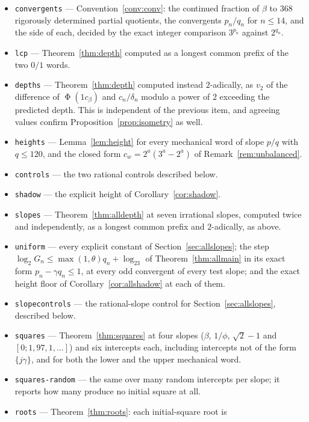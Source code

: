 \documentclass[11pt,reqno]{amsart}
\theoremstyle{plain}
\theoremstyle{definition}
\newcommand{\vt}{v_2}
\DeclareMathOperator{\Ph}{\Phi}
\begin{document}
\begin{itemize}
\item \texttt{convergents} --- Convention~\ref{conv:conv}: the continued fraction
of $\beta$ to $368$ rigorously determined partial quotients, the convergents
$p_n/q_n$ for $n\le14$, and the side of each, decided by the exact integer
comparison $3^{p_n}$ against $2^{q_n}$.
\item \texttt{lcp} --- Theorem~\ref{thm:depth} computed as a longest common
prefix of the two $0/1$ words.
\item \texttt{depths} --- Theorem~\ref{thm:depth} computed instead $2$-adically,
as $\vt$ of the difference of $\Ph(1c_\beta)$ and $c_n/\delta_n$ modulo a power
of $2$ exceeding the predicted depth. This is independent of the previous item,
and agreeing values confirm Proposition~\ref{prop:isometry} as well.
\item \texttt{heights} --- Lemma~\ref{lem:height} for every mechanical word of
slope $p/q$ with $q\le120$, and the closed form
$c_w=2^{a}(3^{a}-2^{a})$ of Remark~\ref{rem:unbalanced}.
\item \texttt{controls} --- the two rational controls described below.
\item \texttt{shadow} --- the explicit height of Corollary~\ref{cor:shadow}.
\item \texttt{slopes} --- Theorem~\ref{thm:alldepth} at seven irrational
slopes, computed twice and independently, as a longest common prefix and
$2$-adically, as above.
\item \texttt{uniform} --- every explicit constant of
Section~\ref{sec:allslopes}; the step $\log_2G_n\le\max(1,\theta)q_n+\log_23$ of
Theorem~\ref{thm:allmain} in its exact form $p_n-\gamma q_n\le1$, at every odd
convergent of every test slope; and the exact height floor of
Corollary~\ref{cor:allshadow} at each of them.
\item \texttt{slopecontrols} --- the rational-slope control for
Section~\ref{sec:allslopes}, described below.
\item \texttt{squares} --- Theorem~\ref{thm:squares} at four slopes
($\beta$, $1/\phi$, $\sqrt2-1$ and $[0;1,97,1,\dots]$) and six intercepts each,
including intercepts not of the form $\{j\gamma\}$, and for both the lower and
the upper mechanical word.
\item \texttt{squares-random} --- the same over many random intercepts per
slope; it reports how many produce no initial square at all.
\item \texttt{roots} --- Theorem~\ref{thm:roots}: each initial-square root is

\end{itemize}
\end{document}
